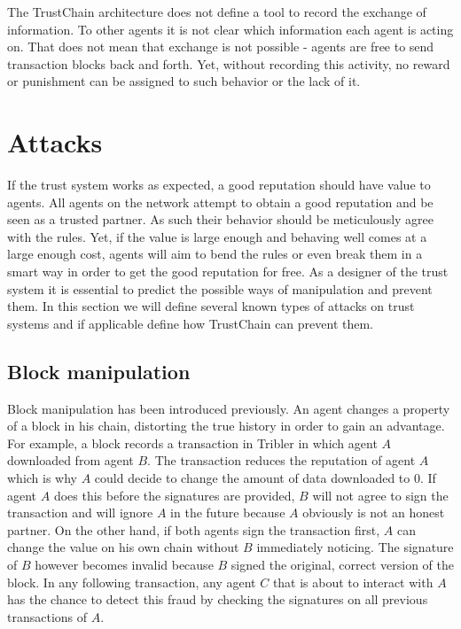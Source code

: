 The TrustChain architecture does not define a tool to record the exchange of information. To other 
agents it is not clear which information each agent is acting on. That does not mean that exchange 
is not possible - agents are free to send transaction blocks back and forth. Yet, without recording
this activity, no reward or punishment can be assigned to such behavior or the lack of it. 


\section{Attacks}
\label{sec:attacks}
If the trust system works as expected, a good reputation should have value to agents. All agents on 
the network attempt to obtain a good reputation and be seen as a trusted partner. As such their 
behavior should be meticulously agree with the rules. Yet, if the value is large enough and behaving
well comes at a large enough cost, agents will aim to bend the rules or even break them in a smart 
way in order to get the good reputation for free. As a designer of the trust system it is essential
to predict the possible ways of manipulation and prevent them. In this section we will define several
known types of attacks on trust systems and if applicable define how TrustChain can prevent them.

\subsection{Block manipulation}
\label{sec:tampering}
Block manipulation has been introduced previously. An agent changes a property of a block in his 
chain, distorting the true history in order to gain an advantage. For example, a block records a 
transaction in Tribler in which agent $A$ downloaded from agent $B$. The transaction reduces the 
reputation of agent $A$ which is why $A$ could decide to change the amount of data downloaded to 0.
If agent $A$ does this before the signatures are provided, $B$ will not agree to sign the transaction
and will ignore $A$ in the future because $A$ obviously is not an honest partner. On the other hand,
if both agents sign the transaction first, $A$ can change the value on his own chain without $B$ 
immediately noticing. The signature of $B$ however becomes invalid because $B$ signed the original, 
correct version of the block. In any following transaction, any agent $C$ that is about to interact
with $A$ has the chance to detect this fraud by checking the signatures on all previous transactions
of $A$. 

